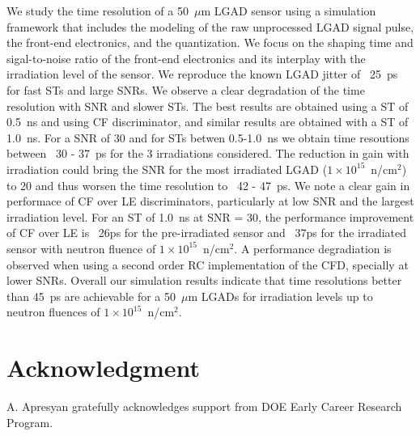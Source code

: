 \documentclass[preprint,1p]{elsarticle}
\begin{document}
We study the time resolution of a 50~$\mu$m LGAD sensor using a simulation framework that includes the
modeling of the raw unprocessed LGAD signal pulse, the front-end electronics, and the quantization.
We focus on the shaping time and sigal-to-noise ratio of the front-end electronics and its interplay
with the irradiation level of the sensor. We reproduce the known LGAD jitter of ~25~\si{ps}
for fast STs and large SNRs. We observe a clear degradation of the time resolution with SNR and slower STs. The best results are
obtained using a ST of 0.5~\si{ns} and using CF discriminator, and similar results are obtained with a ST of 1.0~\si{ns}. For a SNR of 30
and for STs betwen 0.5-1.0~\si{ns} we obtain time resoutions between ~30 - 37~\si{ps} for the 3 irradiations considered. The
reduction in gain with irradiation could bring the SNR for the most irradiated LGAD ($1\times 10^{15}$~n/cm$^2$) to 20 and thus
worsen the time resolution to ~42 - 47~\si{ps}. We note a clear gain in performace of CF over LE discriminators, particularly at
low SNR and the largest irradiation level. For an ST of 1.0~\si{ns} at SNR = 30, the performance improvement of CF over LE
is ~26\si{ps} for the pre-irradiated sensor and ~37\si{ps} for the irradiated sensor with neutron fluence of
$1\times 10^{15}$~n/cm$^2$. A performance degradiation is observed when using a {\color{red}second order RC} implementation of the CFD,
 specially at lower SNRs.
 Overall our simulation results indicate that time resolutions better than
45~\si{ps} are achievable for a 50~$\mu$m LGADs for irradiation levels up to neutron fluences of $1\times 10^{15}$~n/cm$^2$.


\section*{Acknowledgment}


A. Apresyan gratefully acknowledges support from DOE Early Career Research Program.
\end{document}
